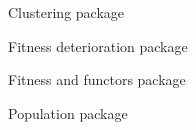 \begin{figure}
  \centering
  \caption{Clustering package}
  \label{optics}
\end{figure}

\begin{figure}
  \centering
  \caption{Fitness deterioration package}
  \label{fitdet}
\end{figure}

\begin{figure}
  \centering
  \caption{Fitness and functors package}
  \label{ea}
\end{figure}

\begin{figure}
  \centering
  \caption{Population package}
  \label{ea}
\end{figure}